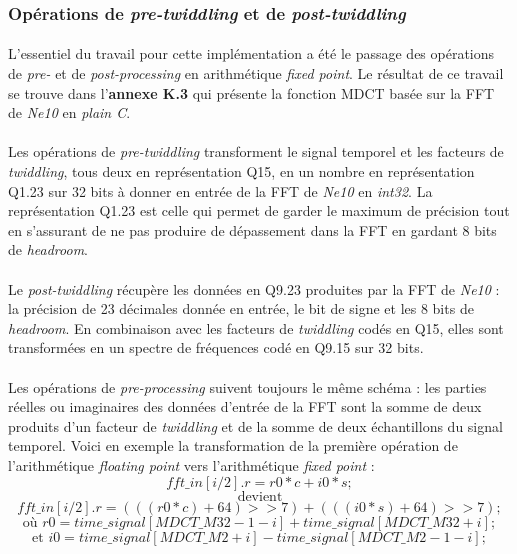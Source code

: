 \documentclass{article}
\begin{document}
    \subsubsection{Opérations de \emph{pre-twiddling} et de \emph{post-twiddling}}
    \paragraph{}
    L'essentiel du travail pour cette implémentation a été le passage des opérations de \emph{pre-} et de \emph{post-processing} en arithmétique \emph{fixed point}. Le résultat de ce travail se trouve dans l'\textbf{annexe K.3} qui présente la fonction MDCT basée sur la FFT de \emph{Ne10} en \emph{plain C}.

    \paragraph{}
    Les opérations de \emph{pre-twiddling} transforment le signal temporel et les facteurs de \emph{twiddling}, tous deux en représentation Q15, en un nombre en représentation Q1.23 sur 32 bits à donner en entrée de la FFT de \emph{Ne10} en \emph{int32}. La représentation Q1.23 est celle qui permet de garder le maximum de précision tout en s'assurant de ne pas produire de dépassement dans la FFT en gardant 8 bits de \emph{headroom}.

    \paragraph{}
    Le \emph{post-twiddling} récupère les données en Q9.23 produites par la FFT de \emph{Ne10} : la précision de 23 décimales donnée en entrée, le bit de signe et les 8 bits de \emph{headroom}. En combinaison avec les facteurs de \emph{twiddling} codés en Q15, elles sont transformées en un spectre de fréquences codé en Q9.15 sur 32 bits.

    \paragraph{}
    Les opérations de \emph{pre-processing} suivent toujours le même schéma : les parties réelles ou imaginaires des données d'entrée de la FFT sont la somme de deux produits d'un facteur de \emph{twiddling} et de la somme de deux échantillons du signal temporel. Voici en exemple la transformation de la première opération de l'arithmétique \emph{floating point} vers l'arithmétique \emph{fixed point} :
    $$fft\_in[i/2].r = r0*c + i0*s;$$
    $$\text{devient}$$
    $$fft\_in[i/2].r = (((r0*c)+64)>>7) + (((i0*s)+64)>>7);$$
    $$\text{où } r0 = time\_signal[MDCT\_M32-1-i] + time\_signal[MDCT\_M32+i];$$
    $$\text{et } i0 = time\_signal[MDCT\_M2+i] - time\_signal[MDCT\_M2-1-i];$$
\end{document}
